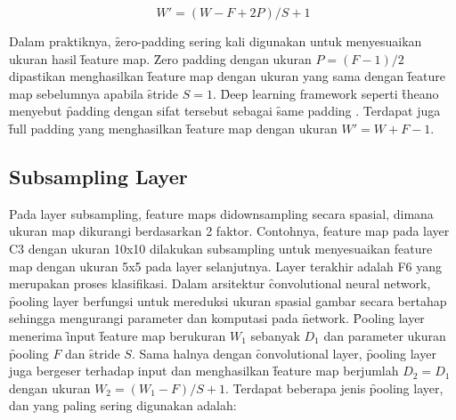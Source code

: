 \begin{equation}
\label{equ:convlayer}
W' = (W - F + 2P) / S + 1
\end{equation}

Dalam praktiknya, \f{zero-padding} sering kali digunakan untuk menyesuaikan ukuran hasil \f{feature map}. \f{Zero padding} dengan ukuran $P = (F - 1)/2$ dipastikan menghasilkan \f{feature map} dengan ukuran yang sama dengan \f{feature map} sebelumnya apabila \f{stride} $S = 1$. \f{Deep learning framework} seperti \f{theano} menyebut \f{padding} dengan sifat tersebut sebagai \f{same padding} . Terdapat juga \f{full padding} yang menghasilkan \f{feature map} dengan ukuran $W' = W + F - 1$.

\subsection{Subsampling Layer}
Pada layer subsampling, feature maps didownsampling secara spasial, dimana ukuran map dikurangi berdasarkan 2 faktor. Contohnya, feature map pada layer C3 dengan ukuran 10x10 dilakukan subsampling untuk menyesuaikan feature map dengan ukuran 5x5 pada layer selanjutnya. Layer terakhir adalah F6 yang merupakan proses klasifikasi.
Dalam arsitektur \f{convolutional neural network}, \f{pooling layer} berfungsi untuk mereduksi ukuran spasial gambar secara bertahap sehingga mengurangi parameter dan komputasi pada \f{network}. \f{Pooling layer} menerima \f{input} \f{feature map} berukuran $W_{1}$ sebanyak $D_{1}$ dan parameter ukuran \f{pooling} $F$ dan \f{stride} $S$. Sama halnya dengan \f{convolutional layer}, \f{pooling layer} juga bergeser terhadap input dan menghasilkan \f{feature map} berjumlah $D_{2} = D_{1}$ dengan ukuran $W_{2} = (W_{1} - F)/S + 1$. Terdapat beberapa jenis \f{pooling layer}, dan yang paling sering digunakan adalah:

